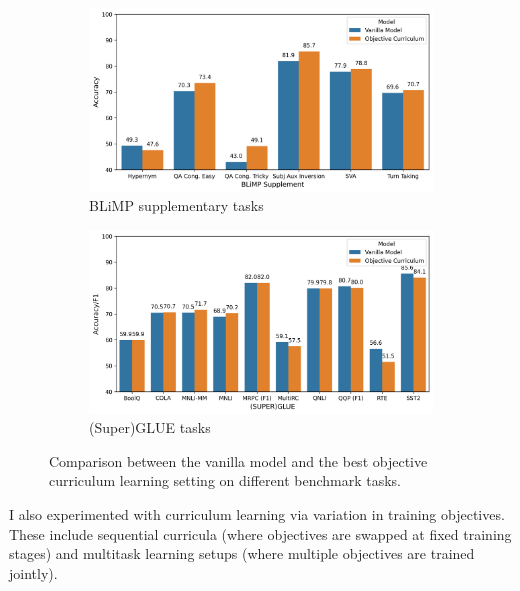 \begin{figure}[h]
    \centering
    \begin{subfigure}[b]{0.48\textwidth}
        \centering
        \includegraphics[width=\textwidth]{chapters/climb/figures/baseline_vs_obj_cl_blimp_supp_new.png}
        \caption{BLiMP supplementary tasks}
        \label{fig:baseline_obj_cl_blimp_supp}
    \end{subfigure}
    \hfill
    \begin{subfigure}[b]{0.48\textwidth}
        \centering
        \includegraphics[width=\textwidth]{chapters/climb/figures/baseline_vs_obj_cl_superglue.png}
        \caption{(Super)GLUE tasks}
        \label{fig:baseline_obj_cl_superglue}
    \end{subfigure}
    \caption{Comparison between the vanilla model and the best objective curriculum learning setting on different benchmark tasks.}
    \label{fig:baseline_obj_cl_comparison}
    \end{figure}

I also experimented with curriculum learning via variation in training objectives. These include sequential curricula (where objectives are swapped at fixed training stages) and multitask learning setups (where multiple objectives are trained jointly).


